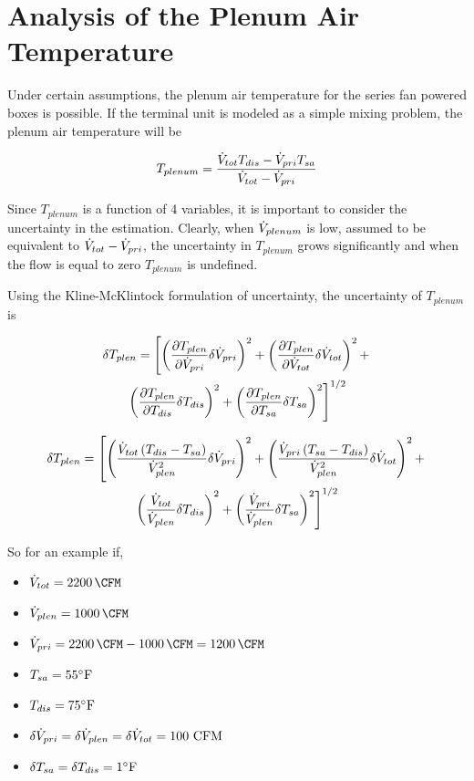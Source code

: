\section{Analysis of the Plenum Air Temperature}

Under certain assumptions, the plenum air temperature for the series fan
powered boxes is possible. If the terminal unit is modeled as a simple
mixing problem, the plenum air temperature will be 

\begin{equation}
    T_{plenum}=\frac{\dot{V}_{tot}T_{dis}-\dot{V}_{pri}T_{sa}}{\dot{V}_{tot} -\dot{V}_{pri}}
\end{equation}

Since \(T_{plenum}\) is a function of 4 variables, it is important to
consider the uncertainty in the estimation. Clearly, when
\(\dot{V}_{plenum}\) is low, assumed to be equivalent to \(\dot{V}_{tot} -
\dot{V}_{pri}\), the uncertainty in  \(T_{plenum}\) grows significantly and
when the flow is equal to zero \(T_{plenum}\) is undefined. 

Using the Kline-McKlintock formulation of uncertainty, the uncertainty
of \(T_{plenum}\) is 

\begin{multline}
    \delta T_{plen} = \left[\left( \pdv{T_{plen}}{\dot{V}_{pri}} \delta \dot{V}_{pri}   \right)^2  +\left( \pdv{T_{plen}}{\dot{V}_{tot}} \delta \dot{V}_{tot}   \right)^2 + \right. \\
    \left. \left( \pdv{T_{plen}}{T_{dis}} \delta T_{dis}   \right)^2 + \left( \pdv{T_{plen}}{T_{sa}} \delta T_{sa}   \right)^2  \right]^{1/2}
\end{multline}

\begin{multline}\label{eq:plenumUncertainty}
    \delta T_{plen} = \left[\left(  \frac{\dot{V}_{tot}\left(T_{dis}-T_{sa} \right)}{{\dot{V}_{plen}}^2}   \delta \dot{V}_{pri} \right)^2  +\left(\frac{\dot{V}_{pri}\left(T_{sa}-T_{dis} \right)}{{\dot{V}_{plen}}^2}      \delta \dot{V}_{tot}   \right)^2 + \right. \\
    \left. \left( \frac{\dot{V}_{tot}}{\dot{V}_{plen}} \delta T_{dis}   \right)^2 + \left(\frac{\dot{V}_{pri}}{\dot{V}_{plen}}  \delta T_{sa}   \right)^2  \right]^{1/2}
\end{multline}

So for an example if, 

\newcommand{\flowtotvalue}{\SI{2200}{\CFM}}
\newcommand{\plenflowvalue}{\SI{1000}{\CFM}}

\begin{itemize}
    \item \(\totflow{}=\flowtotvalue\)
    \item \(\plenflow{}=\plenflowvalue\)
    \item \(\priflow=\flowtotvalue - \plenflowvalue = \SI{1200}{\CFM} \)
    \item \(T_{sa} = 55^{\circ}\text{F} \)
    \item \(T_{dis} = 75^{\circ}\text{F} \)
    \item \(\delta\dot{V}_{pri}{}=\delta\dot{V}_{plen}=\delta\dot{V}_{tot}=100 \text{ CFM}\)
    \item \(\delta T_{sa} = \delta T_{dis} = 1^{\circ} \text{F} \)
\end{itemize}


